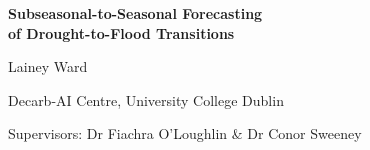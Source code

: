 \documentclass[aspectratio=169]{beamer}
\title[UCD Mathematics PhD Seminar]{}
\author[Lainey Ward]{}
\institute[]{}
\date{}
\begin{document}
\begin{frame}

    \vspace{2.5cm}
    \begin{center}
        {\LARGE\bfseries\color{ucdgreen!90!black}
         Subseasonal-to-Seasonal Forecasting\\[0.3em]
         of Drought-to-Flood Transitions}

        \vspace{1.5em}
        {\large Lainey Ward}

        \vspace{0.6em}
        {\footnotesize Decarb-AI Centre, University College Dublin}

        \vspace{0.3em}
        {\footnotesize\color{gray!75}
         Supervisors: Dr Fiachra O'Loughlin \& Dr Conor Sweeney}
    \end{center}

\end{frame}
\end{document}
